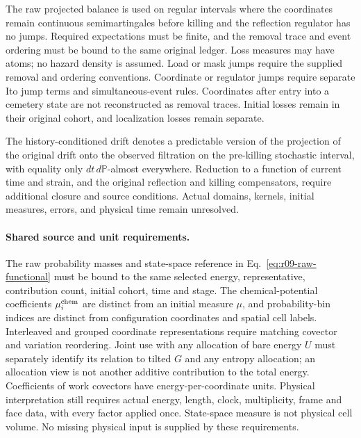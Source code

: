 \documentclass[11pt]{article}
\begin{document}
The raw projected balance is used on regular intervals where the coordinates remain continuous semimartingales before killing and the reflection regulator has no jumps. Required expectations must be finite, and the removal trace and event ordering must be bound to the same original ledger. Loss measures may have atoms; no hazard density is assumed. Load or mask jumps require the supplied removal and ordering conventions. Coordinate or regulator jumps require separate Ito jump terms and simultaneous-event rules. Coordinates after entry into a cemetery state are not reconstructed as removal traces. Initial losses remain in their original cohort, and localization losses remain separate.

The history-conditioned drift denotes a predictable version of the projection of the original drift onto the observed filtration on the pre-killing stochastic interval, with equality only \(dt\,d\mathbb P\)-almost everywhere. Reduction to a function of current time and strain, and the original reflection and killing compensators, require additional closure and source conditions. Actual domains, kernels, initial measures, errors, and physical time remain unresolved.

\paragraph{Shared source and unit requirements.}
The raw probability masses and state-space reference in
Eq.~\eqref{eq:r09-raw-functional} must be bound to the same selected energy,
representative, contribution count, initial cohort, time and stage.
The chemical-potential coefficients $\mu_i^{\rm chem}$ are distinct from an
initial measure $\mu$, and probability-bin indices are distinct from
configuration coordinates and spatial cell labels. Interleaved and grouped
coordinate representations require matching covector and variation
reordering. Joint use with any allocation of bare energy $U$ must separately
identify its relation to tilted $G$ and any entropy allocation; an allocation
view is not another additive contribution to the total energy. Coefficients
of work covectors have energy-per-coordinate units. Physical interpretation
still requires actual energy, length, clock, multiplicity, frame and face
data, with every factor applied once. State-space measure is not physical
cell volume. No missing physical input is supplied by these requirements.
\end{document}
